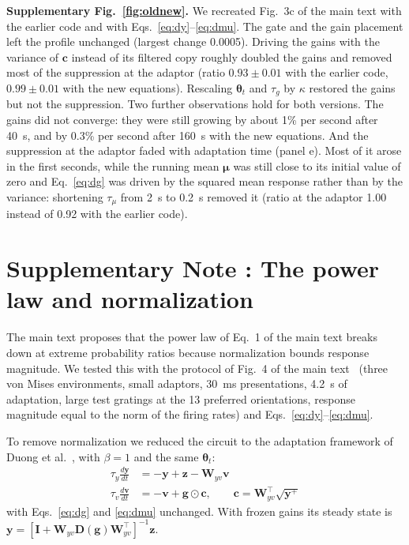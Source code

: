 \documentclass[11pt]{article}
\newcounter{suppnote}
\newcommand{\suppnote}[1]{\refstepcounter{suppnote}\section*{Supplementary Note \arabic{suppnote}: #1}}
\newcommand{\blurb}[1]{\textbf{#1}}
\begin{document}
\blurb{Supplementary Fig.~\ref{fig:oldnew}.} We recreated Fig.~3c of the main text with the earlier code and with Eqs.~\ref{eq:dy}--\ref{eq:dmu}. The gate and the gain placement left the profile unchanged (largest change 0.0005). Driving the gains with the variance of $\bm{c}$ instead of its filtered copy roughly doubled the gains and removed most of the suppression at the adaptor (ratio $0.93\pm0.01$ with the earlier code, $0.99\pm0.01$ with the new equations). Rescaling $\bm{\theta}_t$ and $\tau_g$ by $\kappa$ restored the gains but not the suppression. Two further observations hold for both versions. The gains did not converge: they were still growing by about 1\% per second after 40~s, and by 0.3\% per second after 160~s with the new equations. And the suppression at the adaptor faded with adaptation time (panel e). Most of it arose in the first seconds, while the running mean $\bm{\mu}$ was still close to its initial value of zero and Eq.~\ref{eq:dg} was driven by the squared mean response rather than by the variance: shortening $\tau_\mu$ from 2~s to 0.2~s removed it (ratio at the adaptor 1.00 instead of 0.92 with the earlier code).

\clearpage
\suppnote{The power law and normalization}

The main text proposes that the power law of Eq.~1 of the main text breaks down at extreme probability ratios because normalization bounds response magnitude. We tested this with the protocol of Fig.~4 of the main text~\cite{tring_power_2023} (three von Mises environments, small adaptors, 30~ms presentations, 4.2~s of adaptation, large test gratings at the 13 preferred orientations, response magnitude equal to the norm of the firing rates) and Eqs.~\ref{eq:dy}--\ref{eq:dmu}.

To remove normalization we reduced the circuit to the adaptation framework of Duong et al.~\cite{duong_adaptive_2023-1}, with $\beta=1$ and the same $\bm{\theta}_t$:
\begin{align}
\tau_y \frac{d\bm{y}}{dt} &= -\bm{y} + \bm{z} - \bm{W}_{yv}\bm{v} \\
\tau_v \frac{d\bm{v}}{dt} &= -\bm{v} + \bm{g}\odot\bm{c}, \qquad \bm{c} = \bm{W}_{yv}^\top\sqrt{\bm{y}^+}
\end{align}
with Eqs.~\ref{eq:dg} and \ref{eq:dmu} unchanged. With frozen gains its steady state is $\bm{y}=[\bm{I}+\bm{W}_{yv}\bm{D}(\bm{g})\bm{W}_{yv}^\top]^{-1}\bm{z}$.
\end{document}

